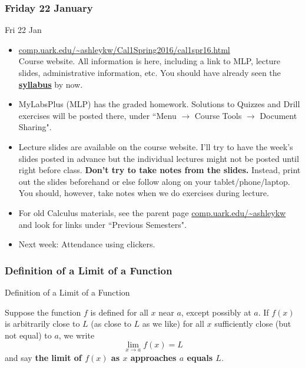 \documentclass[cal1spr16Lectures.tex]{subfiles}
\begin{document}

\subsubsection{\bf Friday 22 January}
\begin{frame}[allowframebreaks]{Fri 22 Jan}
\begin{itemize}\footnotesize
\item \href{http://comp.uark.edu/~ashleykw/Cal1Spring2016/cal1spr16.html}{\alert{\url{comp.uark.edu/~ashleykw/Cal1Spring2016/cal1spr16.html}}} \\
	Course website.  All information is here, including a link to MLP, lecture slides, administrative information, etc.  You should have already seen the 
	\href{http://comp.uark.edu/~ashleykw/Cal1Spring2016/syllabusCal1Spring2016.pdf}{\alert{\textbf{syllabus}}}
	by now.
\item MyLabsPlus (MLP) has the graded homework.   Solutions to Quizzes and Drill exercises will be posted there, under ``Menu $\to$ Course Tools $\to$ Document Sharing".  
%
\framebreak 
\item Lecture slides are available on the course website.  I'll try to have the week's slides posted in advance but the individual lectures might not be posted until right before class.  \textbf{Don't try to take notes from the slides.}  Instead, print out the slides beforehand or else follow along on your tablet/phone/laptop.  You should, however, take notes when we do exercises during lecture.%
\item For old Calculus materials, see the parent page \url{comp.uark.edu/~ashleykw} and look for links under ``Previous Semesters".  
%
\item Next week: Attendance using clickers.
\end{itemize}
\end{frame}

\subsubsection{Definition of a Limit of a Function}
\begin{frame}{\small Definition of a Limit of a Function}
\begin{dfn}[limit]
Suppose the function $f$ is defined for all $x$ near $a$, except possibly at $a$.  If $f(x)$ is arbitrarily close to $L$ (as close to $L$ as we like) for all $x$ sufficiently close (but not equal) to $a$, we write
\[
\lim_{x\to a}f(x)=L
\]
and say \textbf{the limit of $f(x)$ as $x$ approaches $a$ equals $L$}.
\end{dfn}
\end{frame}
\end{document}
